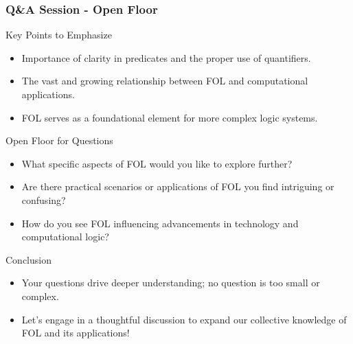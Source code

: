 \documentclass[aspectratio=169]{beamer}
\begin{document}
\begin{frame}[fragile]
  \frametitle{Q\&A Session - Open Floor}
  \begin{block}{Key Points to Emphasize}
    \begin{itemize}
      \item Importance of clarity in predicates and the proper use of quantifiers.
      \item The vast and growing relationship between FOL and computational applications.
      \item FOL serves as a foundational element for more complex logic systems.
    \end{itemize}
  \end{block}
  
  \begin{block}{Open Floor for Questions}
    \begin{itemize}
      \item What specific aspects of FOL would you like to explore further?
      \item Are there practical scenarios or applications of FOL you find intriguing or confusing?
      \item How do you see FOL influencing advancements in technology and computational logic?
    \end{itemize}
  \end{block}
  
  \begin{block}{Conclusion}
    \begin{itemize}
      \item Your questions drive deeper understanding; no question is too small or complex.
      \item Let’s engage in a thoughtful discussion to expand our collective knowledge of FOL and its applications!
    \end{itemize}
  \end{block}
\end{frame}
\end{document}

